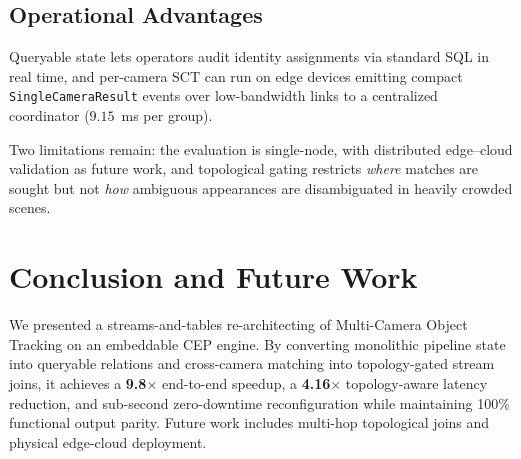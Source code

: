 \documentclass[conference]{IEEEtran}
\begin{document}
\subsection{Operational Advantages}
Queryable state lets operators audit identity assignments via standard SQL in real time, and per-camera SCT can run on edge devices emitting compact \texttt{SingleCameraResult} events over low-bandwidth links to a centralized coordinator ($9.15$~ms per group).

Two limitations remain: the evaluation is single-node, with distributed edge--cloud validation as future work, and topological gating restricts \emph{where} matches are sought but not \emph{how} ambiguous appearances are disambiguated in heavily crowded scenes.

\section{Conclusion and Future Work}
\label{sec:conclusion}
We presented a streams-and-tables re-architecting of Multi-Camera Object Tracking on an embeddable CEP engine. By converting monolithic pipeline state into queryable relations and cross-camera matching into topology-gated stream joins, it achieves a \textbf{9.8$\times$} end-to-end speedup, a \textbf{4.16$\times$} topology-aware latency reduction, and sub-second zero-downtime reconfiguration while maintaining 100\% functional output parity. Future work includes multi-hop topological joins and physical edge-cloud deployment.

{\footnotesize


}
\end{document}
